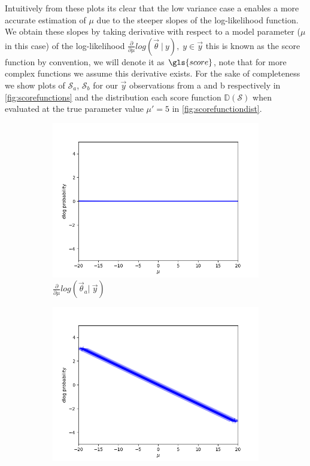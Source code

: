 \noindent Intuitively from these plots its clear that the low variance case a enables a more accurate estimation of $\mu$ due to the steeper slopes of the log-likelihood function. We obtain these slopes by taking derivative with respect to a model parameter ($\mu$ in this case) of the log-likelihood $\frac{\partial}{\partial\mu} log(\vec{\theta}\ |\ y),\;y\in\vec{y}$ this is known as the score function by convention, we will denote it as $\gls{score}$, note that for more complex functions we assume this derivative exists. For the sake of completeness we show plots of $\mathcal{S}_a$, $\mathcal{S}_b$ for our $\vec{y}$ observations from a and b respectively in \cref{fig:scorefunctions} and the distribution each score function $\mathbb{D}(\mathcal{S})$ when evaluated at the true parameter value $\mu' = 5$ in \cref{fig:scorefunctiondist}.
\begin{figure}[H]
    \centering
    \begin{subfigure}{0.475\textwidth}
        \includegraphics[width=\textwidth]{figs/deriv_var_10.png}
        \caption[]{$\frac{\partial}{\partial\mu} log(\vec{\theta}_a |\ \vec{y})$}
    \end{subfigure}
    \begin{subfigure}{0.475\textwidth}
        \includegraphics[width=\textwidth]{figs/deriv_var_0.5.png}

\end{subfigure}
\end{figure}
